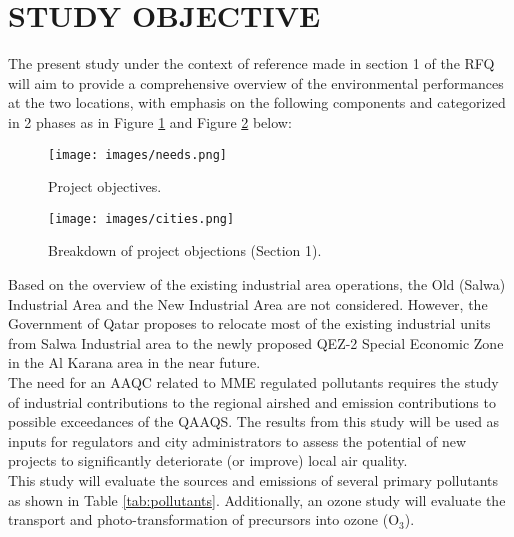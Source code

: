 \section{STUDY OBJECTIVE}

The present study under the context of reference made in section 1 of the RFQ will aim to provide a comprehensive overview of the environmental performances at the two locations, with emphasis on the following components and categorized in 2 phases as in Figure \ref{fig:needs} and Figure \ref{fig:cities} below:

\begin{figure}[H]
\centering
\texttt{[image: images/needs.png]} 
\caption{Project objectives.}
\label{fig:needs}
\end{figure}
%

\begin{figure}[H]
\centering
\texttt{[image: images/cities.png]} 
\caption{Breakdown of project objections (Section 1).}
\label{fig:cities}
\end{figure}
%
 
Based on the overview of the existing industrial area operations, the Old (Salwa) Industrial Area and the New Industrial Area are not considered.  However, the Government of Qatar proposes to relocate most of the existing industrial units from Salwa Industrial area to the newly proposed QEZ-2 Special Economic Zone in the Al Karana area in the near future.\\

The need for an AAQC related to MME regulated pollutants requires the study of industrial contributions to the regional airshed and emission contributions to possible exceedances of the QAAQS.  The results from this study will be used as inputs for regulators and city  administrators to assess the potential of new projects to significantly deteriorate (or improve) local air quality.  \\

This study will evaluate the sources and emissions of several primary pollutants as shown in Table \ref{tab:pollutants}. Additionally, an ozone study will evaluate the transport and photo-transformation of precursors into ozone (O$_{3}$).


